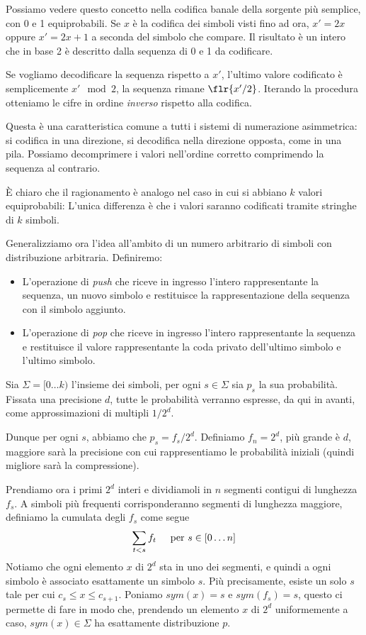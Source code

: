 Possiamo vedere questo concetto nella codifica banale della sorgente più semplice, con 0 e 1 equiprobabili. Se $x$ è la codifica dei simboli visti fino ad ora, $x' = 2x$ oppure $x' = 2x + 1$ a seconda del simbolo che compare. Il risultato è un intero che in base 2 è descritto dalla sequenza di 0 e 1 da codificare.

Se vogliamo decodificare la sequenza rispetto a $x'$, l'ultimo valore codificato è semplicemente $x' \mod 2$, la sequenza rimane $\flr{x'/2}$. Iterando la procedura otteniamo le cifre in ordine \textit{inverso} rispetto alla codifica.

Questa è una caratteristica comune a tutti i sistemi di numerazione asimmetrica: si codifica in una direzione, si decodifica nella direzione opposta, come in una pila. Possiamo decomprimere i valori nell'ordine corretto comprimendo la sequenza al contrario.

È chiaro che il ragionamento è analogo nel caso in cui si abbiano $k$ valori equiprobabili: L'unica differenza è che i valori saranno codificati tramite stringhe di $k$ simboli.

Generalizziamo ora l'idea all'ambito di un numero arbitrario di simboli con distribuzione arbitraria. Definiremo:
\begin{itemize}
    \item L'operazione di \textit{push} che riceve in ingresso l'intero rappresentante la sequenza, un nuovo simbolo e restituisce la rappresentazione della sequenza con il simbolo aggiunto.
    \item L'operazione di \textit{pop} che riceve in ingresso l'intero rappresentante la sequenza e restituisce il valore rappresentante la coda privato dell'ultimo simbolo e l'ultimo simbolo.
\end{itemize}
Sia $\Sigma = [0 \dots k)$ l'insieme dei simboli, per ogni $s \in \Sigma$ sia $p_s$ la sua probabilità. Fissata una precisione $d$, tutte le probabilità verranno espresse, da qui in avanti, come approssimazioni di multipli $1/2^d$.

Dunque per ogni $s$, abbiamo che $p_s = f_s / 2^d$. Definiamo $f_n = 2^d$, più grande è $d$, maggiore sarà la precisione con cui rappresentiamo le probabilità iniziali (quindi migliore sarà la compressione).

Prendiamo ora i primi $2^d$ interi e dividiamoli in $n$ segmenti contigui di lunghezza $f_s$. A simboli più frequenti corrisponderanno segmenti di lunghezza maggiore, definiamo la cumulata degli $f_s$ come segue
\begin{equation*}
    \sum_{t < s}f_t \hspace{5mm} \textnormal{per $s$} \in [0 \dots n]
\end{equation*}
Notiamo che ogni elemento $x$ di $2^d$ sta in uno dei segmenti, e quindi a ogni simbolo è associato esattamente un simbolo $s$. Più precisamente, esiste un solo $s$ tale per cui $c_s \leq x \leq c_{s + 1}$. Poniamo $sym(x) = s$ e $sym(f_s) = s$, questo ci permette di fare in modo che, prendendo un elemento $x$ di $2^d$ uniformemente a caso, $sym(x) \in \Sigma$ ha esattamente distribuzione $p$.


